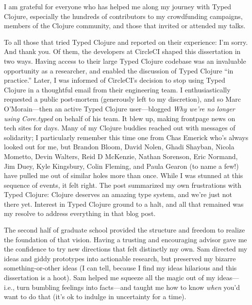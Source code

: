 I am grateful for everyone who has helped me along my journey
with Typed Clojure, especially the hundreds of
contributors to my crowdfunding campaigns, members of the
Clojure community, and those that invited or attended my talks.

To all those that tried Typed Clojure and reported on their experience:
I'm sorry. And thank you.
Of them, the developers at CircleCI shaped this dissertation in two ways.
Having access to their large Typed Clojure
codebase was an invaluable opportunity as a researcher, and enabled the
discussion of Typed Clojure ``in practice.''
Later, I was informed of CircleCI's decision to stop using Typed Clojure
in a thoughtful email from their engineering team.
I enthusiastically requested a public post-mortem (generously left
to my discretion), and so
Marc O'Morain---then an active Typed Clojure user---blogged \emph{Why we're no longer using Core.typed}
on behalf of his team.
It blew up, making frontpage news on tech sites for days.
Many of my Clojure buddies reached out with messages of solidarity; I particularly remember 
this time one from Chas Emerick who's always looked out for me, but Brandon Bloom, David Nolen,
Ghadi Shayban, Nicola Mometto, Devin Walters, Reid D McKenzie, Nathan Sorenson, Eric
Normand, Jim Duey, Kyle Kingsbury, Colin Fleming, and Paula Gearon (to name a few!)
have pulled me out of similar holes more than once.
While I was stunned at this sequence of events, it felt right.
The post summarized my own frustrations with Typed Clojure: Clojure
deserves an amazing type system, and we're just not there yet.
Interest in Typed Clojure ground to a halt,
and all that remained was my resolve to address everything in that blog
post.

The second half of graduate school provided the structure and freedom to
realize the foundation of that vision. Having a trusting and encouraging advisor
gave me the confidence to try new directions that felt distinctly my own.
Sam directed my ideas and giddy prototypes into actionable research,
but preserved my bizarre something-or-other ideas (I can tell, because
I find my ideas hilarious and this dissertation is a hoot).
Sam helped me squeeze all the magic out of my ideas---i.e., turn bumbling feelings into facts---and 
taught me how to know \emph{when} you'd
want to do that (it's ok to indulge in uncertainty for a time).

